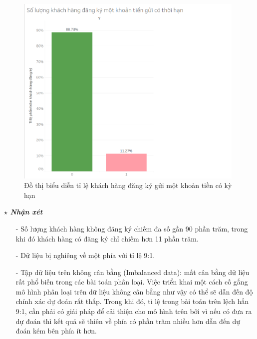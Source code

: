 \documentclass{report}
\begin{document}
          \begin{center}
        \begin{figure}[htp]
    	\begin{center}
    		\includegraphics[width=11cm]{images/hinh1.png}
    	\end{center}
    		\caption{Đồ thị biểu diễn tỉ lệ khách hàng đăng ký gửi một khoản tiền có kỳ hạn}
    \end{figure}
    \end{center}
\fontsize{13}{14}\selectfont \textbf{$\star$\textit{ Nhận xét}}
    \begin{enumerate}
        \item [- ] Số lượng khách hàng không đăng ký chiếm đa số gần 90 phần trăm, trong khi đó khách hàng có đăng ký chỉ chiếm hơn 11 phần trăm.
        \item[- ] Dữ liệu bị nghiêng về một phía với tỉ lệ 9:1.
        \item [- ] Tập dữ liệu trên không cân bằng (Imbalanced data): mất cân bằng dữ liệu rất phổ biến trong các bài toán phân loại. Việc triển khai một cách cố gắng mô hình phân loại trên dữ liệu không cân bằng như vậy có thể sẽ dẫn đến độ chính xác dự đoán rất thấp. Trong khi đó, tỉ lệ trong bài toán trên lệch hẳn 9:1, cần phải có giải pháp để cải thiện cho mô hình trên bởi vì nếu có đưa ra dự đoán thì kết quả sẽ thiên về phía có phần trăm nhiều hơn dẫn đến dự đoán kém bên phía ít hơn.
    \end{enumerate}
    
\end{document}
